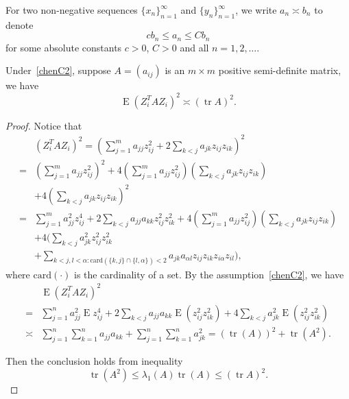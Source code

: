 \documentclass[smallcondensed,final,natbib]{svjour3}          %
\DeclareMathOperator{\mytr}{tr}
\DeclareMathOperator{\myE}{E}
\begin{document}
For two non-negative sequences $\{x_n\}_{n=1}^{\infty}$ and $\{y_n\}_{n=1}^{\infty}$, we write $a_n\asymp b_n$ to denote 
\begin{equation*}
cb_n\leq a_n\leq C b_n
\end{equation*}
for some absolute constants $c>0$, $C>0$ and all $n=1,2,\ldots$.
\begin{lemma}\label{lemmaQ}
    Under~\eqref{chenC2}, suppose $A=(a_{ij})$ is an $m\times m$ positive semi-definite matrix, we have
        \begin{equation*}
        \myE {(Z_i^T A Z_i)}^2\asymp {(\mytr A)}^2.
        \end{equation*}
\begin{proof}
Notice that
    \begin{equation*}
    \begin{aligned}
        &{(Z_i^T A Z_i)}^2
        =
        (\sum_{j=1}^m a_{jj}z_{ij}^2+2\sum_{k<j}a_{jk}z_{ij}z_{ik})^2\\
        =&
        (\sum_{j=1}^m a_{jj}z_{ij}^2)^2+
        4(\sum_{j=1}^m a_{jj}z_{ij}^2)(\sum_{k<j}a_{jk}z_{ij}z_{ik})\\
        &+
        4(\sum_{k<j}a_{jk}z_{ij}z_{ik})^2\\
        =&
        \sum_{j=1}^m a_{jj}^2z_{ij}^4+2\sum_{k<j}a_{jj}a_{kk}z_{ij}^2 z_{ik}^2+
        4(\sum_{j=1}^m a_{jj}z_{ij}^2)(\sum_{k<j}a_{jk}z_{ij}z_{ik})\\
        &+
        4\Big(\sum_{k<j}a_{jk}^2z_{ij}^2z_{ik}^2\\
        &+\sum_{k<j,l<\alpha:\mathrm{card}(\{k,j\}\cap\{l,\alpha\})<2} a_{jk}a_{\alpha l}z_{ij}z_{ik}z_{i\alpha}z_{il}\Big),
    \end{aligned}
    \end{equation*}
    where $\mathrm{card}(\cdot)$ is the cardinality of a set.
    By the assumption~\eqref{chenC2}, we have
    \begin{equation*}
    \begin{aligned}
        &\myE{(Z_i^T A Z_i)}^2\\
        =&
        \sum_{j=1}^n a_{jj}^2 \myE z_{ij}^4+2\sum_{k<j}a_{jj}a_{kk}\myE(z_{ij}^2 z_{ik}^2)+
        4\sum_{k<j}a_{jk}^2 \myE(z_{ij}^2z_{ik}^2)\\
        \asymp &
        \sum_{j=1}^n\sum_{k=1}^n a_{jj}a_{kk}+
        \sum_{j=1}^n\sum_{k=1}^n a_{jk}^2
        ={(\mytr (A))}^2+\mytr ( A^2).
    \end{aligned}
    \end{equation*}

     Then the conclusion holds from inequality
     \begin{equation*}
     \mytr ( A^2)\leq \lambda_1 (A) \mytr(A)\leq {(\mytr A)}^2.
     \end{equation*}

\end{proof}
\end{lemma}
\end{document}
